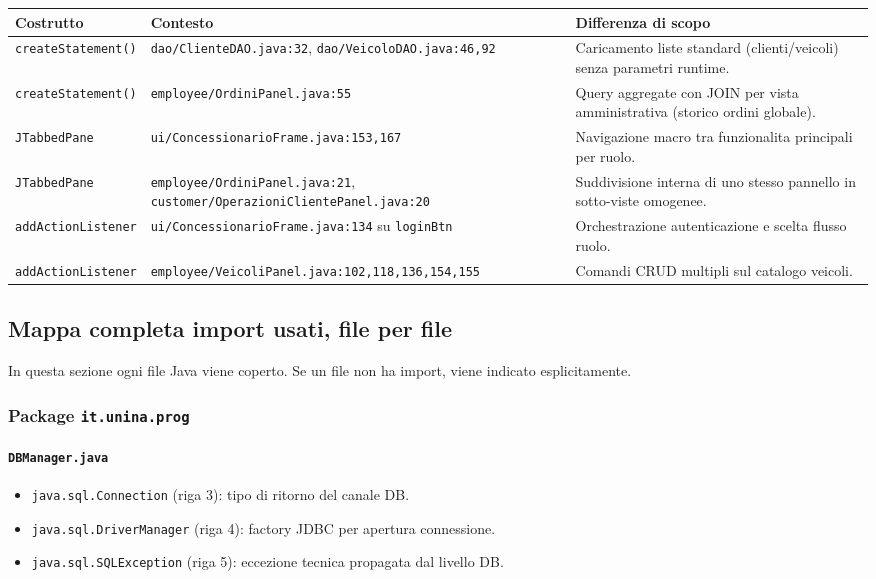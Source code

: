 \documentclass[12pt,a4paper]{article}
\begin{document}
\begin{longtable}{p{} p{} p{}}
\toprule
\textbf{Costrutto} & \textbf{Contesto} & \textbf{Differenza di scopo} \\
\midrule
\endhead
\texttt{createStatement()} & \texttt{dao/ClienteDAO.java:32}, \texttt{dao/VeicoloDAO.java:46,92} & Caricamento liste standard (clienti/veicoli) senza parametri runtime.
\\
\texttt{createStatement()} & \texttt{employee/OrdiniPanel.java:55} & Query aggregate con JOIN per vista amministrativa (storico ordini globale).
\\
\texttt{JTabbedPane} & \texttt{ui/ConcessionarioFrame.java:153,167} & Navigazione macro tra funzionalita principali per ruolo.
\\
\texttt{JTabbedPane} & \texttt{employee/OrdiniPanel.java:21}, \texttt{customer/OperazioniClientePanel.java:20} & Suddivisione interna di uno stesso pannello in sotto-viste omogenee.
\\
\texttt{addActionListener} & \texttt{ui/ConcessionarioFrame.java:134} su \texttt{loginBtn} & Orchestrazione autenticazione e scelta flusso ruolo.
\\
\texttt{addActionListener} & \texttt{employee/VeicoliPanel.java:102,118,136,154,155} & Comandi CRUD multipli sul catalogo veicoli.
\\
\bottomrule
\end{longtable}

\subsection{Mappa completa import usati, file per file}
In questa sezione ogni file Java viene coperto.
Se un file non ha import, viene indicato esplicitamente.

\subsubsection*{Package \texttt{it.unina.prog}}
\paragraph{\texttt{DBManager.java}}
\begin{itemize}
  \item \texttt{java.sql.Connection} (riga 3): tipo di ritorno del canale DB.
  \item \texttt{java.sql.DriverManager} (riga 4): factory JDBC per apertura connessione.
  \item \texttt{java.sql.SQLException} (riga 5): eccezione tecnica propagata dal livello DB.
\end{itemize}
\end{document}
